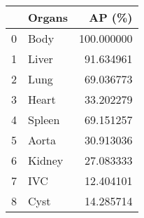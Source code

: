 \begin{tabular}{llr}
\toprule
{} &  Organs &      AP (\%) \\
\midrule
0 &    Body &  100.000000 \\
1 &   Liver &   91.634961 \\
2 &    Lung &   69.036773 \\
3 &   Heart &   33.202279 \\
4 &  Spleen &   69.151257 \\
5 &   Aorta &   30.913036 \\
6 &  Kidney &   27.083333 \\
7 &     IVC &   12.404101 \\
8 &    Cyst &   14.285714 \\
\bottomrule
\end{tabular}
